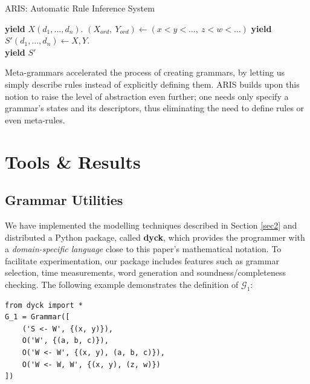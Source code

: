\documentclass{llncs}
\newcommand{\Orderrr}[5]{
	\mathcal{#1}_{#5}\llbracket #2 \leftarrow #3 \mid \{ #4 \} \rrbracket
}
\newcommand{\Orr}[4]{\Orderrr{O}{#1}{#2}{#3}{#4}}
\begin{document}
\begin{algorithm}[H]
\caption{ARIS: Automatic Rule Inference System}\label{euclid}
\begin{algorithmic}
		\State \textbf{yield} $X(d_1,\dots,d_n).$
	\EndFor
		\State $(X_{ord},\ Y_{ord}) \leftarrow (x<y<\dots,\ z<w<\dots)$ 
		\For{$(d_1,...,d_n) \in \Orr{\_}{X,Y}{X_{ord}, Y_{ord}}{2}$}
				\State \textbf{yield} $S'(d_1,\dots ,d_n) \leftarrow X, Y.$
			\EndFor
		\EndFor
	\EndFor
\EndProcedure
\\
					\State \textbf{yield} $S'$
				\EndIf				
			\EndFor
		\EndFor
	\EndFor
\EndProcedure
\end{algorithmic}
\end{algorithm}

Meta-grammars accelerated the process of creating grammars, by letting us simply describe rules instead of explicitly defining them. ARIS builds upon this notion to raise the level of abstraction even further; one needs only specify a grammar's states and its descriptors, thus eliminating the need to define rules or even meta-rules.

\section{Tools \& Results}
\subsection{Grammar Utilities}
We have implemented the modelling techniques described in Section \ref{sec2} and distributed a Python package, called \textbf{dyck}, which provides the programmer with a \textit{domain-specific language} close to this paper's mathematical notation. To facilitate experimentation, our package includes features such as grammar selection, time measurements, word generation and soundness/completeness checking. The following example demonstrates the definition of $\mathcal{G}_1$:

\begin{center}
\begin{minipage}{0.5\textwidth}
\begin{verbatim}
from dyck import *
G_1 = Grammar([
    ('S <- W', {(x, y)}),
    O('W', {(a, b, c)}),
    O('W <- W', {(x, y), (a, b, c)}),
    O('W <- W, W', {(x, y), (z, w)}) 
])
\end{verbatim}
\end{minipage}
\end{center}
\end{document}
